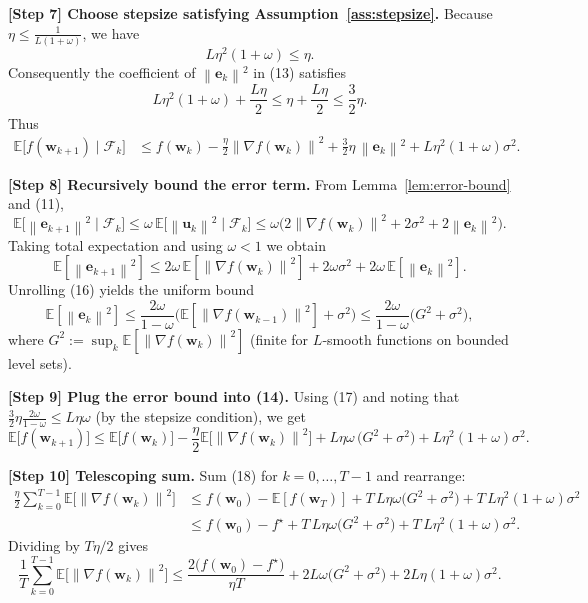 \documentclass{article}
\newcommand{\E}{\mathbb{E}}
\newcommand{\norm}[1]{\left\lVert #1\right\rVert}
\begin{document}
\noindent\textbf{[Step 7] Choose stepsize satisfying Assumption~\ref{ass:stepsize}.}  
Because $\eta\le\frac{1}{L(1+\omega)}$, we have
\[
L\eta^{2}(1+\omega)\le \eta .
\]
Consequently the coefficient of $\norm{\bm e_k}^{2}$ in (13) satisfies
\[
L\eta^{2}(1+\omega)+\frac{L\eta}{2}
\le \eta+\frac{L\eta}{2}
\le \frac{3}{2}\eta .
\]
Thus
\begin{align}
\E\!\big[f(\bm w_{k+1})\mid\mathcal F_k\big]
&\le f(\bm w_k)
   -\frac{\eta}{2}\norm{\nabla f(\bm w_k)}^{2}
   +\frac{3}{2}\eta\,\norm{\bm e_k}^{2}
   +L\eta^{2}(1+\omega)\sigma^{2}. \tag{14}
\end{align}

\noindent\textbf{[Step 8] Recursively bound the error term.}  
From Lemma~\ref{lem:error-bound} and (11),
\[
\E\!\big[\norm{\bm e_{k+1}}^{2}\mid\mathcal F_k\big]
\le\omega\,\E\!\big[\norm{\bm u_k}^{2}\mid\mathcal F_k\big]
\le\omega\big(2\norm{\nabla f(\bm w_k)}^{2}+2\sigma^{2}+2\norm{\bm e_k}^{2}\big). \tag{15}
\]
Taking total expectation and using $\omega<1$ we obtain
\[
\E[\norm{\bm e_{k+1}}^{2}]
\le 2\omega\,\E[\norm{\nabla f(\bm w_k)}^{2}]
    +2\omega\sigma^{2}
    +2\omega\,\E[\norm{\bm e_k}^{2}]. \tag{16}
\]
Unrolling (16) yields the uniform bound
\[
\E[\norm{\bm e_k}^{2}]
\le \frac{2\omega}{1-\omega}\Big(\E[\norm{\nabla f(\bm w_{k-1})}^{2}]+\sigma^{2}\Big)
\le \frac{2\omega}{1-\omega}\Big(G^{2}+\sigma^{2}\Big), \tag{17}
\]
where $G^{2}:=\sup_{k}\E[\norm{\nabla f(\bm w_k)}^{2}]$ (finite for $L$‑smooth functions on bounded level sets).

\noindent\textbf{[Step 9] Plug the error bound into (14).}  
Using (17) and noting that $\frac{3}{2}\eta\frac{2\omega}{1-\omega}\le L\eta\omega$ (by the stepsize condition), we get
\[
\E\!\big[f(\bm w_{k+1})\big]
\le \E\!\big[f(\bm w_k)\big]
   -\frac{\eta}{2}\E\!\big[\norm{\nabla f(\bm w_k)}^{2}\big]
   +L\eta\omega\,\big(G^{2}+\sigma^{2}\big)
   +L\eta^{2}(1+\omega)\sigma^{2}. \tag{18}
\]

\noindent\textbf{[Step 10] Telescoping sum.}  
Sum (18) for $k=0,\dots,T-1$ and rearrange:
\begin{align}
\frac{\eta}{2}\sum_{k=0}^{T-1}\E\!\big[\norm{\nabla f(\bm w_k)}^{2}\big]
&\le f(\bm w_0)-\E[f(\bm w_T)]
   +T\,L\eta\omega\big(G^{2}+\sigma^{2}\big)
   +T\,L\eta^{2}(1+\omega)\sigma^{2} \nonumber\\
&\le f(\bm w_0)-f^\star
   +T\,L\eta\omega\big(G^{2}+\sigma^{2}\big)
   +T\,L\eta^{2}(1+\omega)\sigma^{2}. \tag{19}
\end{align}
Dividing by $T\eta/2$ gives
\[
\frac{1}{T}\sum_{k=0}^{T-1}\E\!\big[\norm{\nabla f(\bm w_k)}^{2}\big]
\le \frac{2\big(f(\bm w_0)-f^\star\big)}{\eta T}
   +2L\omega\big(G^{2}+\sigma^{2}\big)
   +2L\eta(1+\omega)\sigma^{2}. \tag{20}
\]
\end{document}
